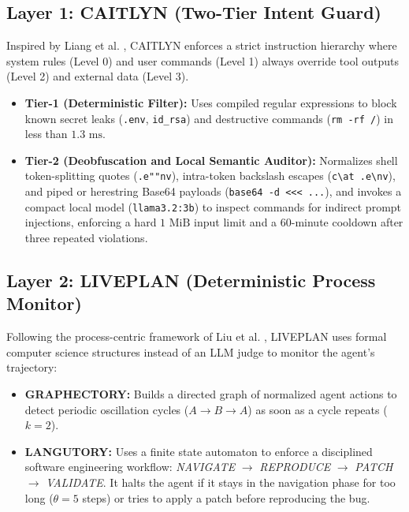 \documentclass[conference]{IEEEtran}
\begin{document}
\subsection{Layer 1: CAITLYN (Two-Tier Intent Guard)}
Inspired by Liang et al. \cite{liang2026caitlyn}, CAITLYN enforces a strict instruction hierarchy where system rules (Level 0) and user commands (Level 1) always override tool outputs (Level 2) and external data (Level 3).
\begin{itemize}
    \item \textbf{Tier-1 (Deterministic Filter):} Uses compiled regular expressions to block known secret leaks (\texttt{.env}, \texttt{id\_rsa}) and destructive commands (\texttt{rm -rf /}) in less than $1.3\text{ ms}$.
    \item \textbf{Tier-2 (Deobfuscation and Local Semantic Auditor):} Normalizes shell token-splitting quotes (\texttt{.e""nv}), intra-token backslash escapes (\texttt{c\textbackslash at .e\textbackslash nv}), and piped or herestring Base64 payloads (\texttt{base64 -d <<< ...}), and invokes a compact local model (\texttt{llama3.2:3b}) to inspect commands for indirect prompt injections, enforcing a hard $1\text{ MiB}$ input limit and a 60-minute cooldown after three repeated violations.
\end{itemize}

\subsection{Layer 2: LIVEPLAN (Deterministic Process Monitor)}
Following the process-centric framework of Liu et al. \cite{liu2025liveplan}, LIVEPLAN uses formal computer science structures instead of an LLM judge to monitor the agent's trajectory:
\begin{itemize}
    \item \textbf{GRAPHECTORY:} Builds a directed graph of normalized agent actions to detect periodic oscillation cycles ($A \to B \to A$) as soon as a cycle repeats ($k=2$).
    \item \textbf{LANGUTORY:} Uses a finite state automaton to enforce a disciplined software engineering workflow: \textit{NAVIGATE} $\to$ \textit{REPRODUCE} $\to$ \textit{PATCH} $\to$ \textit{VALIDATE}. It halts the agent if it stays in the navigation phase for too long ($\theta=5$ steps) or tries to apply a patch before reproducing the bug.
\end{itemize}
\end{document}
